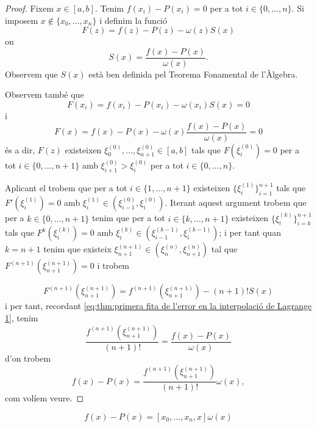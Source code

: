 \documentclass[../Apunts.tex]{subfiles}
\begin{document}
	\begin{proof}
		Fixem \(x\in[a,b]\). Tenim \(f(x_{i})-P(x_{i})=0\) per a tot \(i\in\{0,\dots,n\}\). Si imposem \(x\notin\{x_{0},\dots,x_{n}\}\) i definim la funció
		\[F(z)=f(z)-P(z)-\omega(z)S(x)\]
		on
		\begin{equation}\label{eq:thm:primera fita de l'error en la interpolació de Lagrange 1}
		S(x)=\frac{f(x)-P(x)}{\omega(x)}.
		\end{equation}
		Observem que \(S(x)\) està ben definida pel Teorema Fonamental de l'Àlgebra. %
		
		Observem també que
		\[F(x_{i})=f(x_{i})-P(x_{i})-\omega(x_{i})S(x)=0\]
		i
		\[F(x)=f(x)-P(x)-\omega(x)\frac{f(x)-P(x)}{\omega(x)}=0\]
		és a dir, \(F(z)\) existeixen \(\xi^{(0)}_{0},\dots,\xi^{(0)}_{n+1}\in[a,b]\) tals que \(F(\xi^{(0)}_{i})=0\) per a tot \(i\in\{0,\dots,n+1\}\) amb \(\xi^{(0)}_{i+1}>\xi^{(0)}_{i}\) per a tot \(i\in\{0,\dots,n\}\).
		
		Aplicant el  trobem que per a tot \(i\in\{1,\dots,n+1\}\) existeixen \(\{\xi^{(1)}_{i}\}_{i=1}^{n+1}\) tals que \(F'(\xi^{(1)}_{i})=0\) amb \(\xi^{(1)}_{i}\in(\xi^{(0)}_{i-1},\xi^{(0)}_{i})\). Iterant aquest argument trobem que per a \(k\in\{0,\dots,n+1\}\) tenim que per a tot \(i\in\{k,\dots,n+1\}\) existeixen \(\{\xi^{(k)}_{i}\}_{i=k}^{n+1}\) tals que \(F^{k}(\xi^{(k)}_{i})=0\) amb \(\xi^{(k)}_{i}\in(\xi^{(k-1)}_{i-1},\xi^{(k-1)}_{i})\); i per tant quan \(k=n+1\) tenim que existeix \(\xi^{(n+1)}_{n+1}\in(\xi^{(n)}_{n},\xi^{(n)}_{n+1})\) tal que \(F^{(n+1)}(\xi^{(n+1)}_{n+1})=0\) i trobem%
			\begin{comment}
				\marginpar{Dime si es verdad\\
				Que alguien ha logrado escapar de esta tela de araña.\\
				Dime cuanto cuesta\hfil\twonotes\hfil\\
				Saber la puta verdad\\
				Y quien le pone precio.}
			\end{comment}
		\[F^{(n+1)}(\xi^{(n+1)}_{n+1})=f^{(n+1)}(\xi^{(n+1)}_{n+1})-(n+1)!S(x)\]%
		i per tant, recordant \eqref{eq:thm:primera fita de l'error en la interpolació de Lagrange 1}, tenim
		\[\frac{f^{(n+1)}(\xi^{(n+1)}_{n+1})}{(n+1)!}=\frac{f(x)-P(x)}{\omega(x)}\]
		d'on trobem
		\[f(x)-P(x)=\frac{f^{(n+1)}(\xi^{(n+1)}_{n+1})}{(n+1)!}\omega(x),\]
		com volíem veure.
	\end{proof}
	\begin{observation}
		\[f(x)-P(x)=[x_{0},\dots,x_{n},x]\omega(x)\]
	\end{observation}
\end{document}
